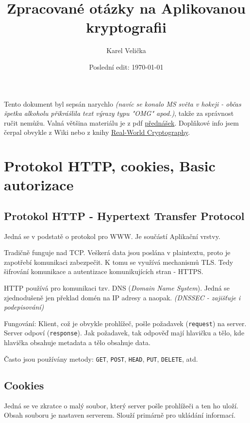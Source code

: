\documentclass[10pt,a4paper]{article}
\title{Zpracované otázky na Aplikovanou kryptografii}
\date{Poslední edit: \today}
\author{\sc Karel Velička}
\begin{document}
\maketitle
\begin{center}
	Tento dokument byl sepsán narychlo \textit{(navíc se konalo MS světa v hokeji - občas špetka alkoholu přikrášlila text výrazy typu "OMG" apod.)}, takže za správnost ručit nemůžu.
	Valná většina materiálu je z pdf \href{https://ak.topsec.cz/}{přednášek}. Doplňkové info jsem čerpal obvykle z Wiki nebo z knihy \href{https://www.manning.com/books/real-world-cryptography}{Real-World Cryptography}.
\end{center}

\tableofcontents
\newpage
\section{Protokol HTTP, cookies, Basic autorizace}

\subsection{Protokol HTTP - Hypertext Transfer Protocol}

Jedná se v podstatě o protokol pro WWW. Je součástí Aplikační vrstvy.

Tradičně funguje nad TCP.
Veškerá data jsou poslána v plaintextu, proto je zapotřebí komunikaci zabezpečit. 
K tomu se využívá mechanismů TLS. 
Tedy šifrování komunikace a autentizace komunikujících stran - HTTPS.

HTTP používá pro komunikaci tzv. DNS (\textit{Domain Name System}). Jedná se zjednodušeně jen překlad domén na IP adresy a naopak.
\textit{(DNSSEC - zajišťuje i podepisování)}

Fungování:
Klient, což je obvykle prohlížeč, pošle požadavek (\texttt{request}) na server.
Server odpoví (\texttt{response}).
Jak požadavek, tak odpověď mají hlavičku a tělo, kde hlavička obsahuje metadata a tělo obsahuje data.


Často jsou používány metody: \texttt{GET}, \texttt{POST}, \texttt{HEAD}, \texttt{PUT}, \texttt{DELETE}, atd.

\subsection{Cookies}

Jedná se ve zkratce o malý soubor, který server pošle prohlížeči a ten ho uloží. 
Obsah souboru je nastaven serverem.
Slouží primárně pro ukládání informací.
\end{document}
